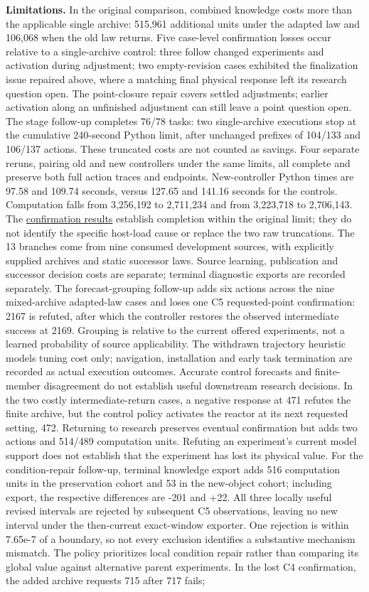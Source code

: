 \documentclass[twoside,11pt]{article}
\begin{document}
\textbf{Limitations.} In the original comparison, combined knowledge costs more than the applicable single archive: 515,961 additional units under the adapted law and 106,068 when the old law returns. Five case-level confirmation losses occur relative to a single-archive control: three follow changed experiments and activation during adjustment; two empty-revision cases exhibited the finalization issue repaired above, where a matching final physical response left its research question open. The point-closure repair covers settled adjustments; earlier activation along an unfinished adjustment can still leave a point question open. The stage follow-up completes 76/78 tasks: two single-archive executions stop at the cumulative 240-second Python limit, after unchanged prefixes of 104/133 and 106/137 actions. These truncated costs are not counted as savings. Four separate reruns, pairing old and new controllers under the same limits, all complete and preserve both full action traces and endpoints. New-controller Python times are 97.58 and 109.74 seconds, versus 127.65 and 141.16 seconds for the controls. Computation falls from 3,256,192 to 2,711,234 and from 3,223,718 to 2,706,143. The \hyperlink{artifact-168}{confirmation results} establish completion within the original limit; they do not identify the specific host-load cause or replace the two raw truncations. The 13 branches come from nine consumed development sources, with explicitly supplied archives and static successor laws. Source learning, publication and successor decision costs are separate; terminal diagnostic exports are recorded separately. The forecast-grouping follow-up adds six actions across the nine mixed-archive adapted-law cases and loses one C5 requested-point confirmation: 2167 is refuted, after which the controller restores the observed intermediate success at 2169. Grouping is relative to the current offered experiments, not a learned probability of source applicability. The withdrawn trajectory heuristic models tuning cost only; navigation, installation and early task termination are recorded as actual execution outcomes. Accurate control forecasts and finite-member disagreement do not establish useful downstream research decisions. In the two costly intermediate-return cases, a negative response at 471 refutes the finite archive, but the control policy activates the reactor at its next requested setting, 472. Returning to research preserves eventual confirmation but adds two actions and 514/489 computation units. Refuting an experiment's current model support does not establish that the experiment has lost its physical value. For the condition-repair follow-up, terminal knowledge export adds 516 computation units in the preservation cohort and 53 in the new-object cohort; including export, the respective differences are -201 and +22. All three locally useful revised intervals are rejected by subsequent C5 observations, leaving no new interval under the then-current exact-window exporter. One rejection is within 7.65e-7 of a boundary, so not every exclusion identifies a substantive mechanism mismatch. The policy prioritizes local condition repair rather than comparing its global value against alternative parent experiments. In the lost C4 confirmation, the added archive requests 715 after 717 fails; 
\end{document}
